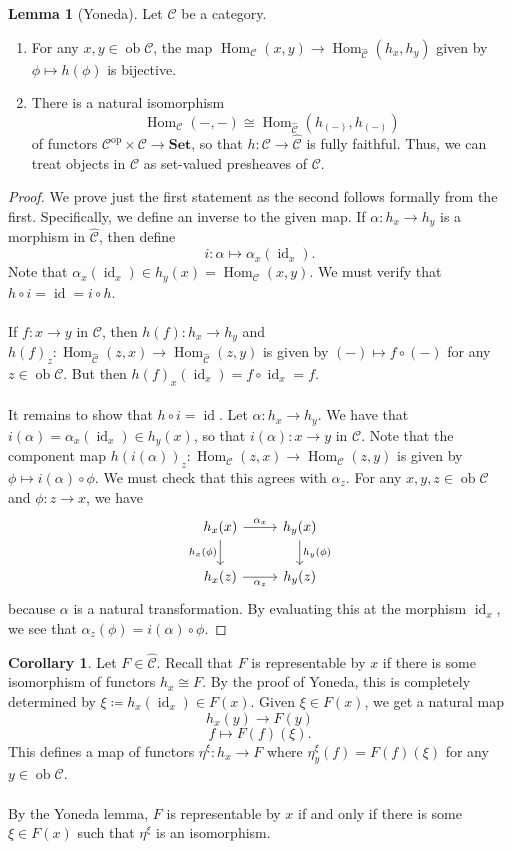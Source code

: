 \documentclass[10pt,letterpaper,cm]{nupset}
\theoremstyle{definition}
\theoremstyle{theorem}
\newtheorem{lemma}[definition]{Lemma}
\newtheorem{corollary}[definition]{Corollary}
\theoremstyle{remark}
\newcommand{\1}{\mathbf{1}}
\renewcommand{\c}{\mathscr{C}}
\newcommand{\0}{\vec 0}
\DeclareMathOperator{\id}{id}
\DeclareMathOperator{\op}{op}
\DeclareMathOperator{\ob}{ob}
\DeclareMathOperator{\Hom}{Hom}
\begin{document}
\begin{lemma}[Yoneda] Let $\c$ be a category.
\begin{enumerate}
\item For any $x, y \in \ob \c$, the map $\Hom_{\c}(x, y) \to \Hom_{\widehat{\c}}(h_x, h_y)$ given by $\phi \mapsto h(\phi)$ is bijective.
\item There is a natural isomorphism $$\Hom_{\c}(-, -) \cong \Hom_{\widehat{\c}}(h_{(-)}, h_{(-)})$$ of functors $ \c^{\op} \times \c \to \mathbf{Set}$, so that $h : \c \to \widehat{\c}$ is fully faithful. Thus, we can treat objects in $\c$ as set-valued presheaves of $\c$.
\end{enumerate}
\end{lemma}
\begin{proof}
We prove just the first statement as the second follows formally from the first.
Specifically, we define an inverse to the given map. If $\alpha : h_x \to h_y$ is a morphism in $\widehat{\c}$, then define $$i : \alpha \mapsto \alpha_x(\id_x).$$ Note that $\alpha_x(\id_x) \in h_y(x) = \Hom_{\c}(x,y)$. We must verify that $h \circ i = \id = i \circ h$.
\\ \\ If $f: x \to y$ in $\c$, then $h(f) : h_x \to h_y$ and $h(f)_z : \Hom_{\widehat{\c}}(z, x) \to \Hom_{\widehat{\c}}(z, y)$ is given by $(-) \mapsto f \circ (-)$ for any $z\in \ob \c$. But then $h(f)_x(\id_x) = f\circ \id_x = f$.
\\ \\ It remains to show that $h \circ i = \id$. Let $\alpha : h_x \to h_y$.  We have that $
i(\alpha) = \alpha_x(\id_x) \in h_y(x)$, so that $i(\alpha) : x \to y$ in $\c$. Note that the component map $h(i(\alpha))_z : \Hom_{\c}(z, x) \to \Hom_{\c}(z, y)$ is given by $\phi \mapsto i(\alpha) \circ \phi.$ We must check that this agrees with $\alpha_z$. For any $x, y, z \in \ob \c$ and $\phi : z \to x$, we have
\[
\begin{tikzcd}
h_x(x) \arrow[r, "\alpha_x"] \arrow[d, "h_x(\phi)"'] & h_y(x) \arrow[d, "h_y(\phi)"] \\
h_x(z) \arrow[r, "\alpha_z"'] & h_y(z)
\end{tikzcd}
\]
because $\alpha$ is a natural transformation. By evaluating this at the morphism $\id_x$, we see that $\alpha_z(\phi) = i(\alpha) \circ \phi$.
\end{proof}

\begin{corollary}
Let $F \in \widehat{\c}$. Recall that $F$ is representable by $x$ if there is some isomorphism of functors $h_x \cong F$. By the proof of Yoneda, this is completely determined by $\xi\coloneqq  h_x(\id_x) \in F(x)$. Given $\xi \in F(x)$, we get a natural map $$h_x(y) \to F(y)$$ $$ f \mapsto F(f)(\xi).$$ This defines a map of functors $\eta^{\xi} : h_x \to F$ where $\eta^{\xi}_y(f) = F(f)(\xi)$ for any $y \in \ob \c$. 
\\ \\ By the Yoneda lemma, $F$ is representable by $x$  if and only if there is some $\xi \in F(x)$ such that $\eta^{\xi}$ is an isomorphism. 
\end{corollary}
\end{document}
